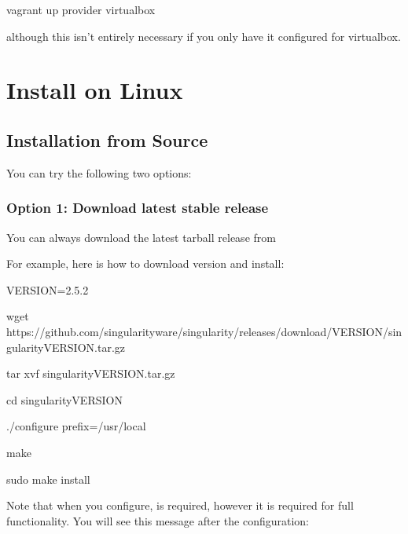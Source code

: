 \documentclass[letterpaper,10pt,english]{sphinxmanual}
\begin{document}
%
\begin{sphinxVerbatim}[commandchars=\\\{\}]
vagrant up \PYGZhy{}\PYGZhy{}provider virtualbox
\end{sphinxVerbatim}

although this isn’t entirely necessary if you only have it configured for virtualbox.


\section{Install on Linux}
\label{\detokenize{installation:install-on-linux}}

\subsection{Installation from Source}
\label{\detokenize{installation:installation-from-source}}
You can try the following two options:


\subsubsection{Option 1: Download latest stable release}
\label{\detokenize{installation:option-1-download-latest-stable-release}}
You can always download the latest tarball release from 

For example, here is how to download version  and install:

%
\begin{sphinxVerbatim}[commandchars=\\\{\}]
VERSION=2.5.2

wget https://github.com/singularityware/singularity/releases/download/\PYGZdl{}VERSION/singularity\PYGZhy{}\PYGZdl{}VERSION.tar.gz

tar xvf singularity\PYGZhy{}\PYGZdl{}VERSION.tar.gz

cd singularity\PYGZhy{}\PYGZdl{}VERSION

./configure \PYGZhy{}\PYGZhy{}prefix=/usr/local

make

sudo make install
\end{sphinxVerbatim}

Note that when you configure,  is  required, however it is required for full functionality. You will see this message after the configuration:
\end{document}
